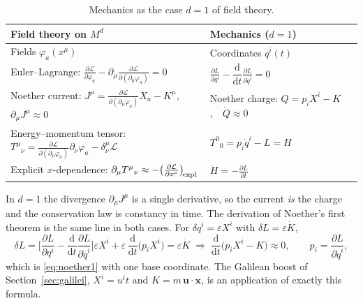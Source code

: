 \documentclass[11pt,a4paper,openany]{book}
\theoremstyle{definition}
\theoremstyle{plain}
\theoremstyle{remark}
\newcommand{\dd}{\mathrm{d}}
\newcommand{\pd}[2]{\frac{\partial #1}{\partial #2}}
\newcommand{\eps}{\varepsilon}
\newcommand{\vx}{\bm{x}}
\newcommand{\weakeq}{\approx}
\begin{document}
\begin{table}[ht]
\centering
\small
\renewcommand{\arraystretch}{1.35}
\setlength{\tabcolsep}{4pt}
\begin{tabular}{@{}>{\raggedright\arraybackslash}p{7.3cm}>{\raggedright\arraybackslash}p{7.3cm}@{}}
\toprule
Field theory on $M^d$ & Mechanics ($d=1$)\\
\midrule
Fields $\varphi_a(x^\mu)$ & Coordinates $q^i(t)$\\
Euler--Lagrange: $\pd{\mathcal L}{\varphi_a}-\partial_\mu\pd{\mathcal L}{(\partial_\mu\varphi_a)}=0$
  & $\pd{L}{q^i}-\dfrac{\dd}{\dd t}\pd{L}{\dot q^i}=0$\\
Noether current: $J^\mu=\pd{\mathcal L}{(\partial_\mu\varphi_a)}X_a-K^\mu$,\ \ $\partial_\mu J^\mu\weakeq0$
  & Noether charge: $Q=p_iX^i-K$,\ \ $\dot Q\weakeq0$\\
Energy--momentum tensor: $T^\mu{}_\nu=\pd{\mathcal L}{(\partial_\mu\varphi_a)}\partial_\nu\varphi_a-\delta^\mu_\nu\mathcal L$
  & $T^0{}_0=p_i\dot q^i-L=H$\\
Explicit $x$-dependence: $\partial_\mu T^\mu{}_\nu\weakeq-\big(\pd{\mathcal L}{x^\nu}\big)_{\!\rm expl}$
  & $\dot H=-\pd{L}{t}$\\
\bottomrule
\end{tabular}
\caption{Mechanics as the case $d=1$ of field theory.}
\label{tab:dictionary-dof}
\end{table}

In $d=1$ the divergence $\partial_\mu J^\mu$ is a single derivative, so the
current \emph{is} the charge and the conservation law is constancy in time.
The derivation of Noether's first theorem is the same line in both cases. For
$\delta q^i=\eps X^i$ with $\delta L=\eps\dot K$,
\begin{equation}\label{eq:noether-mech}
  \delta L=\Big[\pd{L}{q^i}-\frac{\dd}{\dd t}\pd{L}{\dot q^i}\Big]\eps X^i
  +\eps\,\frac{\dd}{\dd t}\big(p_iX^i\big)=\eps\dot K
  \;\Longrightarrow\;
  \frac{\dd}{\dd t}\big(p_iX^i-K\big)\weakeq0,\qquad p_i=\pd{L}{\dot q^i},
\end{equation}
which is \eqref{eq:noether1} with one base coordinate. The Galilean boost of
Section~\ref{sec:galilei}, $X^i=u^it$ and $K=m\,\bm u\!\cdot\!\vx$, is an
application of exactly this formula.
\end{document}
